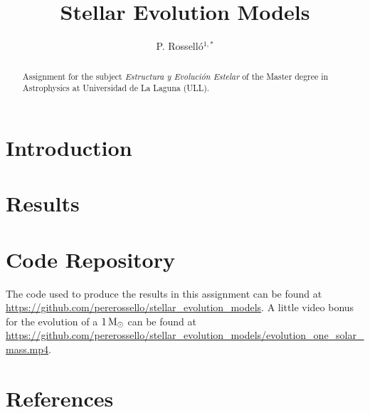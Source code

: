 \documentclass{anotherarticlestyle}
\title{Stellar Evolution Models}
\author{P. Rosselló$^{1,*}$}
\begin{document}
\maketitle

\begin{strip}
    \begin{abstract}
        {\small
            Assignment for the subject \textit{Estructura y Evolución Estelar} of the Master degree in Astrophysics at Universidad de La Laguna (ULL).
        }
    \end{abstract}
\end{strip}




\section{Introduction}


\section{Results}

\newpage
\section{Code Repository}
The code used to produce the results in this assignment can be found at \url{https://github.com/pererossello/stellar_evolution_models}. A little video bonus for the evolution of a $1 \, {\rm M}_\odot$ can be found at \url{https://github.com/pererossello/stellar_evolution_models/evolution_one_solar_mass.mp4}.

\newpage
\pagebreak
\onecolumn
\twocolumn


\section*{References}




% 




% 

% 
\end{document}
